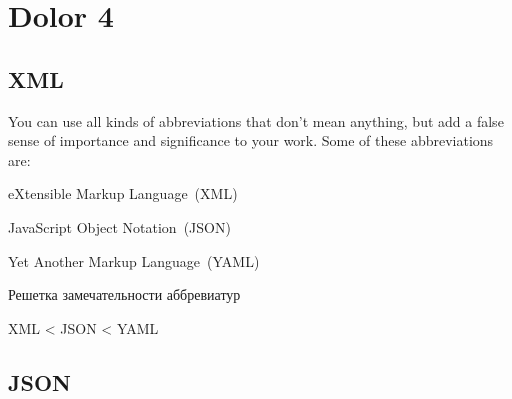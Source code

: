 \chapter{Dolor 4}

\section{XML}

\blindtext

You can use all kinds of abbreviations that don't mean anything, but add
a false sense of importance and significance to your work. Some of these
abbreviations are:
%
\begin{itemize*}
\item eXtensible Markup Language~(XML)
\item JavaScript Object Notation~(JSON)
\item Yet Another Markup Language~(YAML)
\end{itemize*}
%

\begin{table}
\captionsetup{skip=5pt}
\caption{Решетка замечательности аббревиатур}
\centering
XML < JSON < YAML
\end{table}

\Blindtext

\section{JSON}

\Blindtext
